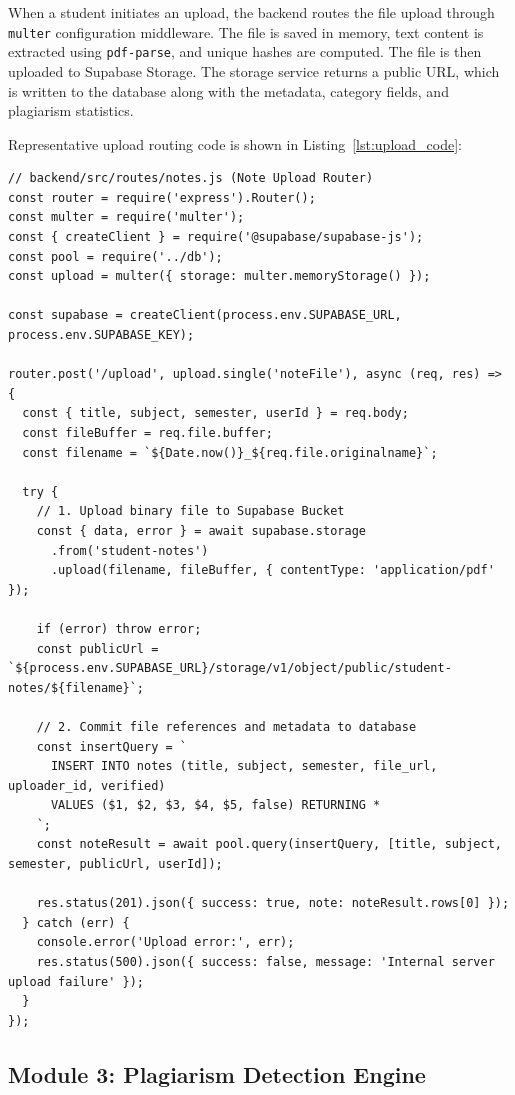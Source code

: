 \documentclass[12,Times new Roman,a4paper]{report}
\begin{document}
When a student initiates an upload, the backend routes the file upload through \texttt{multer} configuration middleware. The file is saved in memory, text content is extracted using \texttt{pdf-parse}, and unique hashes are computed. The file is then uploaded to Supabase Storage. The storage service returns a public URL, which is written to the database along with the metadata, category fields, and plagiarism statistics.

Representative upload routing code is shown in Listing~\ref{lst:upload_code}:

\begin{verbatim}
// backend/src/routes/notes.js (Note Upload Router)
const router = require('express').Router();
const multer = require('multer');
const { createClient } = require('@supabase/supabase-js');
const pool = require('../db');
const upload = multer({ storage: multer.memoryStorage() });

const supabase = createClient(process.env.SUPABASE_URL, process.env.SUPABASE_KEY);

router.post('/upload', upload.single('noteFile'), async (req, res) => {
  const { title, subject, semester, userId } = req.body;
  const fileBuffer = req.file.buffer;
  const filename = `${Date.now()}_${req.file.originalname}`;

  try {
    // 1. Upload binary file to Supabase Bucket
    const { data, error } = await supabase.storage
      .from('student-notes')
      .upload(filename, fileBuffer, { contentType: 'application/pdf' });

    if (error) throw error;
    const publicUrl = `${process.env.SUPABASE_URL}/storage/v1/object/public/student-notes/${filename}`;

    // 2. Commit file references and metadata to database
    const insertQuery = `
      INSERT INTO notes (title, subject, semester, file_url, uploader_id, verified) 
      VALUES ($1, $2, $3, $4, $5, false) RETURNING *
    `;
    const noteResult = await pool.query(insertQuery, [title, subject, semester, publicUrl, userId]);
    
    res.status(201).json({ success: true, note: noteResult.rows[0] });
  } catch (err) {
    console.error('Upload error:', err);
    res.status(500).json({ success: false, message: 'Internal server upload failure' });
  }
});
\end{verbatim}
\label{lst:upload_code}

\subsection{Module 3: Plagiarism Detection Engine}
\end{document}
